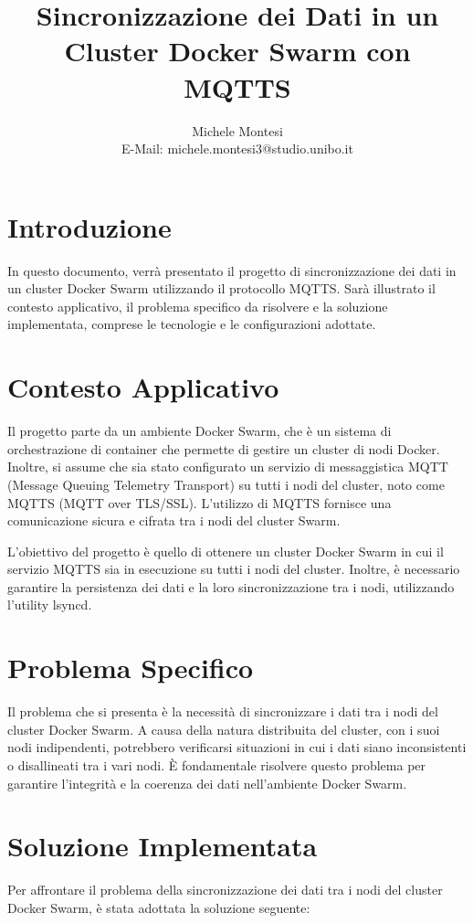 \documentclass{article}
\title{Sincronizzazione dei Dati in un Cluster Docker Swarm con MQTTS}
\author{Michele Montesi \\
        E-Mail: michele.montesi3@studio.unibo.it}
\begin{document}
\maketitle

\section{Introduzione}
In questo documento, verrà presentato il progetto di sincronizzazione 
dei dati in un cluster Docker Swarm utilizzando il protocollo MQTTS. 
Sarà illustrato il contesto applicativo, il problema specifico da risolvere e 
la soluzione implementata, comprese le tecnologie e le configurazioni adottate.

\section{Contesto Applicativo}
Il progetto parte da un ambiente Docker Swarm, che è un sistema di orchestrazione 
di container che permette di gestire un cluster di nodi Docker. Inoltre, si assume 
che sia stato configurato un servizio di messaggistica MQTT (Message Queuing Telemetry Transport) 
su tutti i nodi del cluster, noto come MQTTS (MQTT over TLS/SSL). 
L'utilizzo di MQTTS fornisce una comunicazione sicura e cifrata tra i nodi del cluster Swarm.

L'obiettivo del progetto è quello di ottenere un cluster Docker Swarm in cui il 
servizio MQTTS sia in esecuzione su tutti i nodi del cluster. Inoltre, è necessario 
garantire la persistenza dei dati e la loro sincronizzazione tra i nodi, utilizzando 
l'utility lsyncd.

\section{Problema Specifico}
Il problema che si presenta è la necessità di sincronizzare i dati tra i nodi del 
cluster Docker Swarm. A causa della natura distribuita del cluster, con i suoi nodi 
indipendenti, potrebbero verificarsi situazioni in cui i dati siano inconsistenti o disallineati 
tra i vari nodi. È fondamentale risolvere questo problema per garantire l'integrità e la coerenza 
dei dati nell'ambiente Docker Swarm.

\section{Soluzione Implementata}
Per affrontare il problema della sincronizzazione dei dati tra i nodi del 
cluster Docker Swarm, è stata adottata la soluzione seguente:
\end{document}
